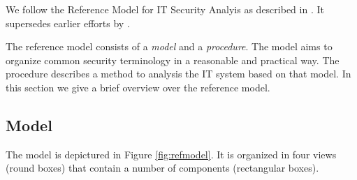 We follow the Reference Model for IT Security Analyis as described in \cite{Grimm}.
It supersedes earlier efforts by \cite{Avizienis}.

The reference model consists of a \emph{model} and a \emph{procedure}.
The model aims to organize common security terminology in a reasonable and practical way.
The procedure describes a method to analysis the IT system based on that model.
In this section we give a brief overview over the reference model.

\subsection{Model}



The model is depictured in Figure \ref{fig:refmodel}.
It is organized in four views (round boxes) that contain a number of components (rectangular boxes).




